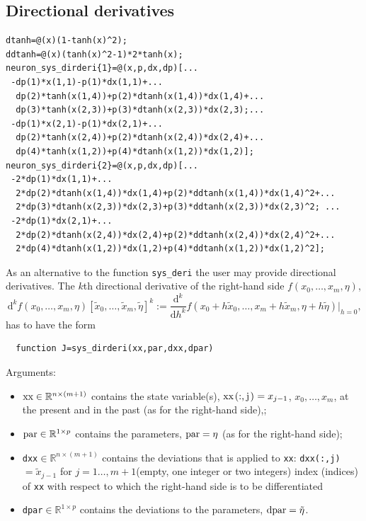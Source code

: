 \documentclass[10pt]{scrartcl}
\renewcommand{\d}{\mathrm{d}}
\newcommand{\RR}{\mathbb{R}}
\newcommand{\blist}[1]{\mbox{\lstinline!#1!}}
\begin{document}
\subsection{Directional derivatives}
\label{sec:dirderi}
\begin{lstlisting}[float,floatplacement=t,frame=lines,label=neuron_sys_dirderi,caption={First two directional derivatives of right-hand side of \cref{example_sys} (not vectorized, see \url{../demos/neuron/html/demo1_funcs.html} and note that
 provision of this pair of functions is less complex than the routine
 for \blist{neuron_sys_deri} in \Cref{neuron:sys:deri}).}]
dtanh=@(x)(1-tanh(x)^2);
ddtanh=@(x)(tanh(x)^2-1)*2*tanh(x);
neuron_sys_dirderi{1}=@(x,p,dx,dp)[...
 -dp(1)*x(1,1)-p(1)*dx(1,1)+...
  dp(2)*tanh(x(1,4))+p(2)*dtanh(x(1,4))*dx(1,4)+...
  dp(3)*tanh(x(2,3))+p(3)*dtanh(x(2,3))*dx(2,3);...
 -dp(1)*x(2,1)-p(1)*dx(2,1)+...
  dp(2)*tanh(x(2,4))+p(2)*dtanh(x(2,4))*dx(2,4)+...
  dp(4)*tanh(x(1,2))+p(4)*dtanh(x(1,2))*dx(1,2)];
neuron_sys_dirderi{2}=@(x,p,dx,dp)[...
 -2*dp(1)*dx(1,1)+...
  2*dp(2)*dtanh(x(1,4))*dx(1,4)+p(2)*ddtanh(x(1,4))*dx(1,4)^2+...
  2*dp(3)*dtanh(x(2,3))*dx(2,3)+p(3)*ddtanh(x(2,3))*dx(2,3)^2; ...
 -2*dp(1)*dx(2,1)+...
  2*dp(2)*dtanh(x(2,4))*dx(2,4)+p(2)*ddtanh(x(2,4))*dx(2,4)^2+...
  2*dp(4)*dtanh(x(1,2))*dx(1,2)+p(4)*ddtanh(x(1,2))*dx(1,2)^2];
 \end{lstlisting}
As an alternative to the function \blist{sys_deri} the user may
provide directional derivatives. The $k$th directional derivative of
the right-hand side $f(x_0,\ldots,x_m,\eta)$,
\begin{displaymath}
  \d^kf(x_0,\ldots,x_m,\eta)[\tilde{x}_0,\ldots,\tilde{x}_m,\tilde{\eta}]^k:=
  \frac{\d^k}{\d h^k}f(x_0+h\tilde{x}_0,\ldots,x_m+h\tilde{x}_m,\eta+h\tilde{\eta})\vert_{h=0}\mbox{,}
\end{displaymath}
 has to have the form
\begin{lstlisting}
  function J=sys_dirderi(xx,par,dxx,dpar)
\end{lstlisting}
Arguments:
\begin{itemize}
\item $\blist{xx}\in\RR^{n\times (m+1)}$ contains the state
  variable(s), $\blist{xx(:,j)}=x_{j-1}$, $x_0,\ldots,x_m$, at the present and in the past (as
  for the right-hand side),;
\item $\blist{par}\in\RR^{1\times
  p}$ contains the parameters, $\blist{par}=\eta$  (as for the right-hand side);
\item \blist{dxx}$\in\RR^{n\times(m+1)}$ contains the deviations that is applied to
  \blist{xx}: \blist{dxx(:,j)}$=\tilde{x}_{j-1}$ for
    $j=1\ldots,m+1$(empty, one integer or two integers) index
    (indices) of \blist{xx} with respect to which the right-hand side
    is to be differentiated
\item \blist{dpar}$\in\RR^{1\times
  p}$ contains the deviations to the parameters, $\blist{dpar}=\tilde{\eta}$.
\end{itemize}
\end{document}
